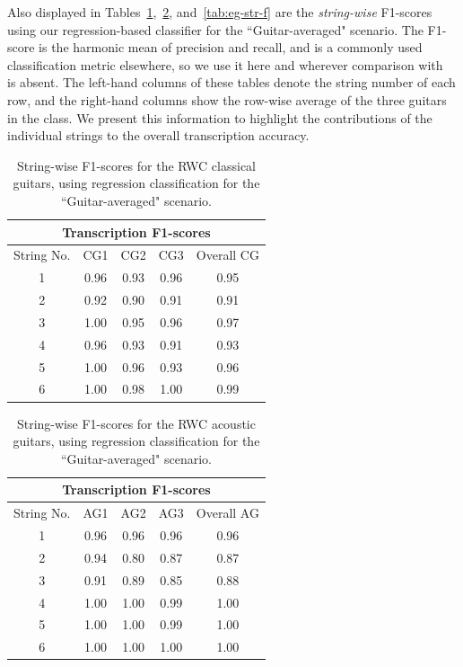 \documentclass[12pt]{cmuthesis}
\begin{document}
Also displayed in Tables~\ref{tab:cg-str-f},~\ref{tab:ag-str-f}, and~\ref{tab:eg-str-f} are the \textit{string-wise} F1-scores using our regression-based classifier for the ``Guitar-averaged" scenario. The F1-score is the harmonic mean of precision and recall, and is a commonly used classification metric elsewhere, so we use it here and wherever comparison with~\cite{barbanchoi2012} is absent. The left-hand columns of these tables denote the string number of each row, and the right-hand columns show the row-wise average of the three guitars in the class. We present this information to highlight the contributions of the individual strings to the overall transcription accuracy.

\begin{table}[!htbp]
\begin{center}
\begin{tabular}{||c|c|c|c|c||}
\hline
\multicolumn{5}{||c||}{\bf{Transcription F1-scores}} \\
\hline
String No. & CG1 & CG2 & CG3 & Overall CG \\
\hline
1 & 0.96 & 0.93 & 0.96 & 0.95\\
\hline
2 & 0.92 & 0.90 & 0.91 & 0.91\\
\hline
3 & 1.00 & 0.95 & 0.96 & 0.97\\
\hline
4 & 0.96 & 0.93 & 0.91 & 0.93\\
\hline
5 & 1.00 & 0.96 & 0.93 & 0.96 \\
\hline
6 & 1.00 & 0.98 & 1.00 & 0.99\\ 
\hline
\hline
\end{tabular}
\caption{String-wise F1-scores for the RWC classical guitars, using regression classification for the ``Guitar-averaged" scenario.} 
\label{tab:cg-str-f}
\end{center}
\end{table}

\begin{table}[!htbp]
\begin{center}
\begin{tabular}{||c||c|c|c|c||}
\hline
\multicolumn{5}{||c||}{\bf{Transcription F1-scores}} \\
\hline
String No. & AG1 & AG2 & AG3 & Overall AG \\
\hline
1 &  0.96 & 0.96 & 0.96 & 0.96 \\
\hline
2 & 0.94 & 0.80 & 0.87 &  0.87\\
\hline
3 & 0.91 & 0.89 & 0.85 & 0.88\\
\hline
4 & 1.00 & 1.00 & 0.99 &  1.00 \\
\hline
5 & 1.00 & 1.00 & 0.99 &  1.00 \\
\hline
6 & 1.00 & 1.00 & 1.00 & 1.00 \\ 
\hline
\hline
\end{tabular}
\caption{String-wise F1-scores for the RWC acoustic guitars, using regression classification for the ``Guitar-averaged" scenario.} 
\label{tab:ag-str-f}
\end{center}
\end{table}
\end{document}
